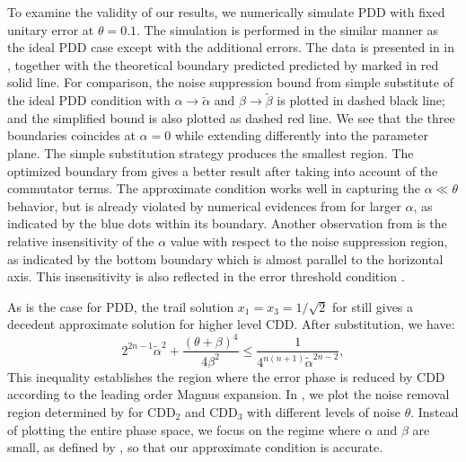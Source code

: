 \documentclass[aps,pra,reprint,superscriptaddress]{revtex4-2}
\newcommand{\alphat}{\widetilde{\alpha}}
\newcommand{\betat}{\widetilde{\beta}}
\begin{document}
To examine the validity of our results, we numerically simulate PDD with fixed unitary error at $\theta=0.1$. The simulation is performed in the similar manner as the ideal PDD case except with the additional errors. The data is presented in in ,  together with the theoretical boundary 
predicted predicted by  marked in red solid line.
For comparison, the noise suppression bound from simple substitute of the ideal PDD condition with $\alpha\to\alphat$ and $\beta\to\betat$ is plotted in dashed black line; and the simplified bound   is also plotted as dashed red line. 
We see that the three boundaries coincides at $\alpha=0$ while extending  differently into the parameter plane. The simple substitution strategy produces the smallest region. The optimized boundary from  gives a better result after taking into account of the commutator terms.   The approximate condition  works well in capturing the $\alpha\ll\theta$ behavior, but is already violated by numerical evidences from 
 for larger $\alpha$, as indicated by the blue dots within its boundary. Another observation from  is the relative insensitivity of the $\alpha$ value with respect to the noise suppression region, as indicated by the bottom boundary which is almost parallel to the horizontal axis. This insensitivity is also reflected in the 
error threshold condition .




As is the case for PDD, the trail solution $x_1=x_3=1/\sqrt{2}$ for  still gives a
decedent approximate solution for higher level CDD. 
After substitution, we have:
\begin{equation}\label{eq:ncdd-bound-simple}
2^{2n-1} \alphat^2 + \frac{(\theta+\beta)^4}{4\beta^2}\le \frac{1}{4^{n(n+1)}\alphat^{2n-2}},
\end{equation}
This inequality establishes the region where the error phase is reduced by CDD according to the leading order Magnus expansion. 
In , we plot the noise removal region determined by  for $\mathrm{CDD}_2$ and $\mathrm{CDD}_3$ with different levels of noise $\theta$. Instead of plotting the entire phase space, we focus on the regime where $\alpha$ and $\beta$ are small, as defined by , so that our approximate condition is accurate.
\end{document}
